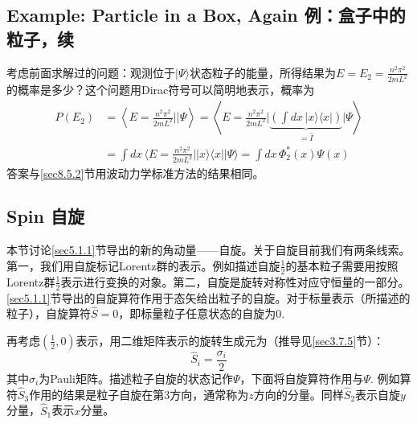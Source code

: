 \subsection[例：盒子中的粒子，续]{Example: Particle in a Box, Again \quad 例：盒子中的粒子，续}
\label{sec8.5.4}
考虑前面求解过的问题：观测位于$|\Psi\rangle$状态粒子的能量，所得结果为$E = E_2 = \frac{n^2 \pi^2}{2mL^2}$的概率是多少？这个问题用Dirac符号可以简明地表示，概率为
\begin{align*}
	P(E_2) &= \left\langle E = \frac{n^2 \pi^2}{2mL^2} \bigg|\bigg| \Psi \right\rangle = \left\langle E = \frac{n^2 \pi^2}{2mL^2} \bigg| \underbrace{ \left( \int dx\, |x\rangle \langle x| \right) }_{= \hat{I}} \bigg| \Psi \right\rangle \\
	&= \int dx\, \langle E = \frac{n^2 \pi^2}{2mL^2} || x \rangle \langle x || \Psi \rangle = \int dx\, \Phi_2^* (x) \Psi(x)
\end{align*} 
答案与\ref{sec8.5.2}节用波动力学标准方法的结果相同。


\subsection[自旋]{Spin 自旋}
\label{sec8.5.5}
本节讨论\ref{sec5.1.1}节导出的新的角动量——自旋。关于自旋目前我们有两条线索。第一，我们用自旋标记Lorentz群的表示。例如描述自旋$\frac{1}{2}$的基本粒子需要用按照Lorentz群$\frac{1}{2}$表示进行变换的对象。第二，自旋是旋转对称性对应守恒量的一部分。\ref{sec5.1.1}节导出的自旋算符作用于态矢给出粒子的自旋。对于标量表示（所描述的粒子），自旋算符$\hat{S} = 0$，即标量粒子任意状态的自旋为$0$.

再考虑$(\frac{1}{2}, 0)$表示，用二维矩阵表示的旋转生成元为（推导见\ref{sec3.7.5}节）：
\begin{equation}
\label{equ8.45}
	\hat{S}_i = \frac{\sigma_i}{2}
\end{equation}
其中$\sigma_i$为Pauli矩阵。描述粒子自旋的状态记作$\Psi$，下面将自旋算符作用与$\Psi$. 例如算符$\hat{S}_3$作用的结果是粒子自旋在第$3$方向，通常称为$z$方向的分量。同样$\hat{S}_2$表示自旋$y$分量，$\hat{S}_1$表示$x$分量。


